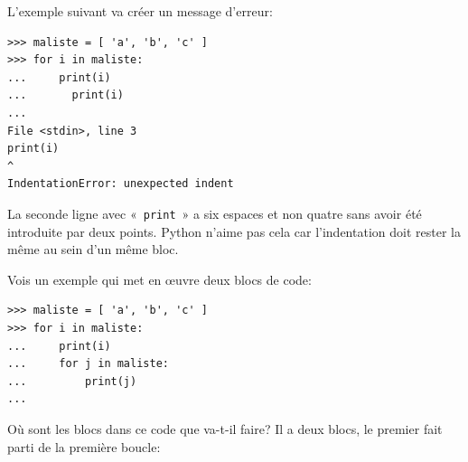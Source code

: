 L'exemple suivant va créer un message d'erreur:

\begin{Verbatim}[frame=single,rulecolor=\color{red}, label=erreur]
>>> maliste = [ 'a', 'b', 'c' ]
>>> for i in maliste:
...     print(i)
...       print(i)
...
File <stdin>, line 3
print(i)
^
IndentationError: unexpected indent
\end{Verbatim}

La seconde ligne avec « \texttt{print} » a six espaces et non quatre sans avoir été introduite par deux points. Python n'aime pas cela car l'indentation doit rester la même au sein d'un même bloc.

\begin{center}

\end{center}



Vois un exemple qui met en œuvre deux blocs de code:

\begin{Verbatim}[frame=single,rulecolor=\color{gray}, label=ne pas saisir]
>>> maliste = [ 'a', 'b', 'c' ]
>>> for i in maliste:
...     print(i)
...     for j in maliste:
...         print(j)
...
\end{Verbatim}

Où sont les blocs dans ce code que va-t-il faire?
Il a deux blocs, le premier fait parti de la première boucle:

